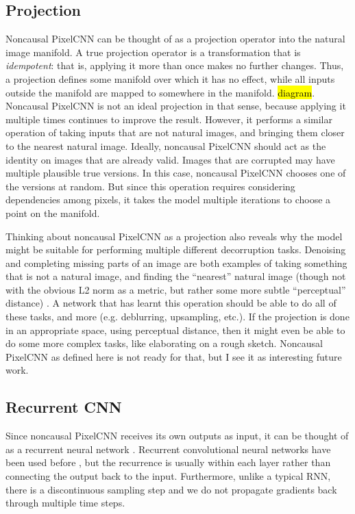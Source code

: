 \documentclass[10pt,a4paper]{article}
\newcommand{\nquote}[1]{``{#1}''}
\begin{document}
\subsection{Projection}

Noncausal PixelCNN can be thought of as a projection operator into the natural image manifold. A true projection operator is a transformation that is \emph{idempotent}: that is, applying it more than once makes no further changes. Thus, a projection defines some manifold over which it has no effect, while all inputs outside the manifold are mapped to somewhere in the manifold. \hl{diagram}. Noncausal PixelCNN is not an ideal projection in that sense, because applying it multiple times continues to improve the result. However, it performs a similar operation of taking inputs that are not natural images, and bringing them closer to the nearest natural image. Ideally, noncausal PixelCNN should act as the identity on images that are already valid. Images that are corrupted may have multiple plausible true versions. In this case, noncausal PixelCNN chooses one of the versions at random. But since this operation requires considering dependencies among pixels, it takes the model multiple iterations to choose a point on the manifold.

Thinking about noncausal PixelCNN as a projection also reveals why the model might be suitable for performing multiple different decorruption tasks. Denoising and completing missing parts of an image are both examples of taking something that is not a natural image, and finding the \nquote{nearest} natural image (though not with the obvious L2 norm as a metric, but rather some more subtle \nquote{perceptual} distance) \citep{imageinpainting}. A network that has learnt this operation should be able to do all of these tasks, and more (e.g. deblurring, upsampling, etc.). If the projection is done in an appropriate space, using perceptual distance, then it might even be able to do some more complex tasks, like elaborating on a rough sketch. Noncausal PixelCNN as defined here is not ready for that, but I see it as interesting future work.

\subsection{Recurrent CNN}

Since noncausal PixelCNN receives its own outputs as input, it can be thought of as a recurrent neural network \citep{??}. Recurrent convolutional neural networks have been used before \citep{??,??}, but the recurrence is usually within each layer rather than connecting the output back to the input. Furthermore, unlike a typical RNN, there is a discontinuous sampling step and we do not propagate gradients back through multiple time steps.
\end{document}
